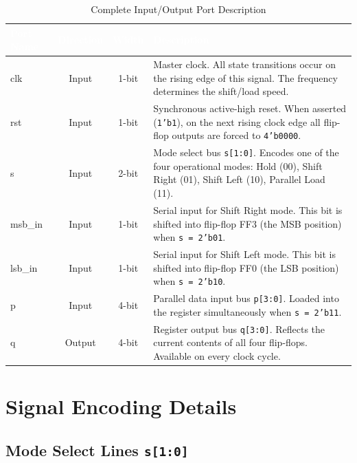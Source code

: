 \documentclass[12pt,a4paper]{report}
\begin{document}
\begin{table}[H]
    \centering
    \caption{Complete Input/Output Port Description}
    \renewcommand{\arraystretch}{1.35}
    \begin{tabularx}{\textwidth}{>{\ttfamily}l c c X}
        \toprule
        \rowcolor{tableheader}
        \textcolor{white}{\textbf{Port Name}} &
        \textcolor{white}{\textbf{Direction}} &
        \textcolor{white}{\textbf{Width}} &
        \textcolor{white}{\textbf{Description}} \\
        \midrule
        clk     & Input  & 1-bit & Master clock. All state transitions occur on the rising edge of this signal. The frequency determines the shift/load speed. \\
        \rowcolor{lightgray}
        rst     & Input  & 1-bit & Synchronous active-high reset. When asserted (\texttt{1'b1}), on the next rising clock edge all flip-flop outputs are forced to \texttt{4'b0000}. \\
        s       & Input  & 2-bit & Mode select bus \texttt{s[1:0]}. Encodes one of the four operational modes: Hold (00), Shift Right (01), Shift Left (10), Parallel Load (11). \\
        \rowcolor{lightgray}
        msb\_in & Input  & 1-bit & Serial input for Shift Right mode. This bit is shifted into flip-flop FF3 (the MSB position) when \texttt{s = 2'b01}. \\
        lsb\_in & Input  & 1-bit & Serial input for Shift Left mode. This bit is shifted into flip-flop FF0 (the LSB position) when \texttt{s = 2'b10}. \\
        \rowcolor{lightgray}
        p       & Input  & 4-bit & Parallel data input bus \texttt{p[3:0]}. Loaded into the register simultaneously when \texttt{s = 2'b11}. \\
        q       & Output & 4-bit & Register output bus \texttt{q[3:0]}. Reflects the current contents of all four flip-flops. Available on every clock cycle. \\
        \bottomrule
    \end{tabularx}
    \label{tab:ports}
\end{table}

\section{Signal Encoding Details}

\subsection{Mode Select Lines \texttt{s[1:0]}}
\end{document}
